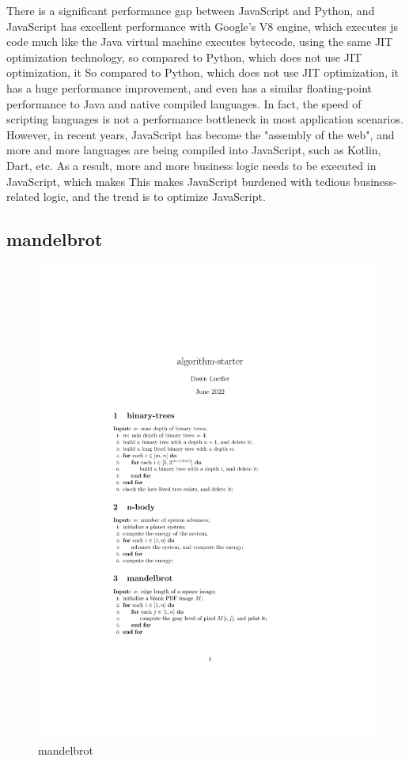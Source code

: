 There is a significant performance gap between JavaScript and Python, and JavaScript has excellent performance with Google's V8 engine, which executes js code much like the Java virtual machine executes bytecode, using the same JIT optimization technology, so compared to Python, which does not use JIT optimization, it So compared to Python, which does not use JIT optimization, it has a huge performance improvement, and even has a similar floating-point performance to Java and native compiled languages. In fact, the speed of scripting languages is not a performance bottleneck in most application scenarios. However, in recent years, JavaScript has become the "assembly of the web", and more and more languages are being compiled into JavaScript, such as Kotlin, Dart, etc. As a result, more and more business logic needs to be executed in JavaScript, which makes This makes JavaScript burdened with tedious business-related logic, and the trend is to optimize JavaScript.

\subsection{mandelbrot}

\begin{figure}[htbp]
    \centerline{\includegraphics[scale=0.8]{figures/mandelbrot}}
    \caption{mandelbrot}
    \label{fig:mandelbrot}
\end{figure}


